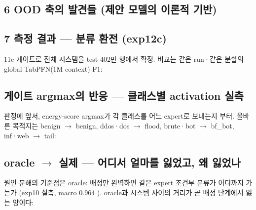 \subsection*{6 OOD 축의 발견들 (제안 모델의 이론적 기반)}
\subsection*{7 측정 결과 — 분류 환전 (exp12c)}
11c 게이트로 전체 시스템을 test 402만 행에서 확정. 비교는 같은 run·같은 분할의 global TabPFN(1M context) F1:

\subsection*{게이트 argmax의 반응 — 클래스별 activation 실측}
판정에 앞서, energy-score argmax가 각 클래스를 어느 expert로 보내는지 부터. 올바른 목적지는 benign \ensuremath{\rightarrow} benign, ddos·dos \ensuremath{\rightarrow} flood, brute·bot \ensuremath{\rightarrow} bf\_\allowbreak{}bot, inf·web \ensuremath{\rightarrow} tail:

\subsection*{oracle  \ensuremath{\rightarrow}  실제 — 어디서 얼마를 잃었고, 왜 잃었나}
원인 분해의 기준점은 oracle: 배정만 완벽하면 같은 expert 조건부 분류가 어디까지 가는가 (exp10 실측, macro 0.964 ). oracle과 시스템 사이의 거리가 곧 배정 단계에서 잃는 양이다:

